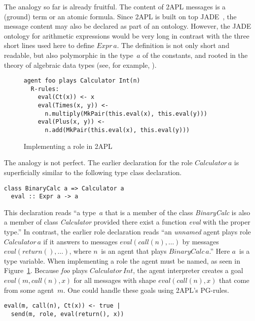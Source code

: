 \documentclass[a4paper,12pt,oneside,fleqn]{book} %
\begin{document}
The analogy so far is already fruitful. The content of 2APL messages is a
(ground) term or an atomic formula. Since 2APL is built on top
JADE~\cite{DBLP:books/sp/map2005/BellifemineBCP05}, the message content may
also be declared as part of an ontology. However, the JADE ontology for
arithmetic expressions would be very long in contrast with the three short
lines used here to define $\mathit{Expr}\,a$. The definition is not only
short and readable, but also polymorphic in the type~$a$ of the constants,
and rooted in the theory of algebraic data types (see, for example,
\cite{DBLP:conf/ctcs/Hagino87}).

\begin{figure}\footnotesize %
\begin{verbatim}
agent foo plays Calculator Int(n)
  R-rules:
    eval(Ct(x)) <- x
    eval(Times(x, y)) <-
      n.multiply(MkPair(this.eval(x), this.eval(y)))
    eval(Plus(x, y)) <-
      n.add(MkPair(this.eval(x), this.eval(y)))
\end{verbatim}
\caption{Implementing a role in 2APL}\label{fig:roleimpl2APL}
\end{figure} %

The analogy is not perfect. The earlier declaration for the role
$\mathit{Calculator}\,a$ is superficially similar to the following type
class declaration.
\begin{verbatim}
class BinaryCalc a => Calculator a
  eval :: Expr a -> a
\end{verbatim}

This declaration reads ``a type~$a$ that is a member of the class
\textit{BinaryCalc} is also a member of class \textit{Calculator} provided
there exist a function \textit{eval} with the proper type.'' In contrast,
the earlier role declaration reads ``an \emph{unnamed} agent plays role
$\mathit{Calculator}\,a$ if it answers to messages
$\mathit{eval}(\mathit{call}(n),\ldots)$ by messages
$\mathit{eval}(\mathit{return}(),\ldots)$, where $n$~is an agent that plays
$\mathit{BinaryCalc}\,a$.'' Here $a$~is a type variable.  When implementing
a role the agent must be named, as seen in Figure~\ref{fig:roleimpl2APL}.
Because \textit{foo} plays $\mathit{Calculator}\,\mathit{Int}$, the agent
interpreter creates a goal $\mathit{eval}(m,\mathit{call}(n),x)$ for all
messages with shape $\mathit{eval}(\mathit{call}(n),x)$ that come from some
agent~$m$.  One could handle these goals using 2APL's PG-rules.

\begin{verbatim}
eval(m, call(n), Ct(x)) <- true |
  send(m, role, eval(return(), x))
\end{verbatim}
\end{document}
